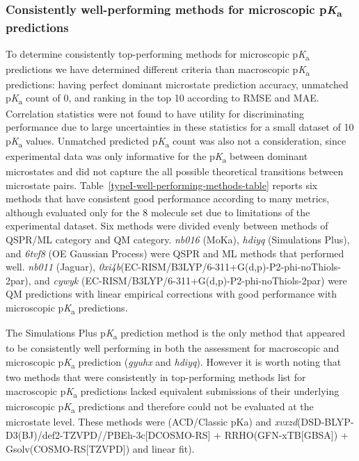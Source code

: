 \documentclass[9pt,lineno,final]{elife}
\newcommand{\pKa}{p\textit{K}\textsubscript{a}}
\begin{document}
\subsubsection{Consistently well-performing methods for microscopic \pKa{} predictions}

To determine consistently top-performing methods for microscopic \pKa{} predictions we have determined different criteria than macroscopic \pKa{} predictions: having perfect dominant microstate prediction accuracy, unmatched \pKa{} count of 0, and ranking in the top 10 according to RMSE and MAE. Correlation statistics were not found to have utility for discriminating performance due to large uncertainties in these statistics for a small dataset of 10 \pKa{} values. Unmatched predicted \pKa{} count was also not a consideration, since experimental data was only informative for the \pKa{} between dominant microstates and did not capture the all possible theoretical transitions between microstate pairs. Table~\ref{typeI-well-performing-methods-table} reports six methods that have consistent good performance according to many metrics, although evaluated only for the 8 molecule set due to limitations of the experimental dataset. Six methods were divided evenly between methods of QSPR/ML category and QM category. \textit{nb016} (MoKa), \textit{hdiyq} (Simulations Plus), and \textit{6tvf8} (OE Gaussian Process) were QSPR and ML methods that performed well. \textit{nb011} (Jaguar), \textit{0xi4b}(EC-RISM/B3LYP/6-311+G(d,p)-P2-phi-noThiols-2par), and \textit{cywyk} (EC-RISM/B3LYP/6-311+G(d,p)-P2-phi-noThiols-2par) were QM predictions with linear empirical corrections with good performance with microscopic \pKa{} predictions. 

The Simulations Plus \pKa{} prediction method is the only method that appeared to be consistently well performing in both the assessment for macroscopic and microscopic \pKa{} prediction (\textit{gyuhx} and \textit{hdiyq}). However it is worth noting that two methods that were consistently in top-performing methods list for macroscopic \pKa{} predictions lacked equivalent submissions of their underlying microscopic \pKa{} predictions and therefore could not be evaluated at the microstate level. These methods were \textit{} (ACD/Classic pKa) and \textit{xvxzd}(DSD-BLYP-D3(BJ)/def2-TZVPD//PBEh-3c[DCOSMO-RS] + RRHO(GFN-xTB[GBSA]) + Gsolv(COSMO-RS[TZVPD]) and linear fit). 
\end{document}
